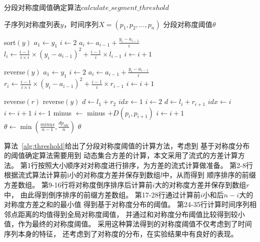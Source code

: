 \begin{algorithm}[t]
  \caption{分段对称度阈值确定算法$calculate\_segment\_threshold$}
  \label{alg:threshold}
  \small
  \begin{algorithmic}
    \REQUIRE 子序列对称度列表$y$，时间序列$X=\left(p_{1}, p_{2}, \dots, p_{n}\right)$
    \ENSURE 分段对称度阈值$\theta$

    \STATE sort$(y)$
    \STATE $a_1 \leftarrow y_1$
    \STATE $i \leftarrow 2$
    \STATE $a_i \leftarrow a_{i-1}+\frac{y_i-a_{i-1}}{i}$
    \STATE $l_i \leftarrow \frac{i-1}{i \times i} \times(y_i-a_{i-1})^{2}+\frac{i-1}{i} \times l_{i-1}$
    \STATE $i \leftarrow i+1$
    \ENDWHILE

    \STATE reverse$(y)$
    \STATE $a_1 \leftarrow y_1$
    \STATE $i \leftarrow 2$
    \STATE $a_i \leftarrow a_{i-1}+\frac{y_i-a_{i-1}}{i}$
    \STATE $r_i \leftarrow \frac{i-1}{i \times i} \times (y_i-a_{i-1})^{2}+\frac{i-1}{i} \times r_{i-1}$
    \STATE $i \leftarrow i+1$
    \ENDWHILE

    \STATE reverse$(r)$
    \STATE reverse$(y)$
    \STATE $d \leftarrow l_1 + r_2$
    \STATE $idx \leftarrow 1$
    \STATE $i \leftarrow 2$
    \STATE $d \leftarrow l_i + r_{i+1}$
    \STATE $idx \leftarrow i$
    \ENDIF
    \STATE $i \leftarrow i+1$
    \ENDWHILE
    \STATE $i \leftarrow 1$
    \STATE minus $\leftarrow$ minus $+D\left(p_{i}, p_{i+1}\right)$
    \STATE $i \leftarrow i+1$
    \ENDWHILE
    \STATE $\theta \leftarrow \min \left(\frac{minus}{n-1}, \frac{dp_{idx}}{n}\right)$
    \RETURN $\theta$
  \end{algorithmic}
\end{algorithm}

算法~\ref{alg:threshold}给出了分段对称度阈值的计算方法，考虑到
基于对称度分布的阈值确定算法需要用到
动态集合方差的计算，本文采用了流式的方差计算方法。
第1行按照大小顺序对对称度进行排序，为方差的流式计算做准备。
第2-8行根据流式算法计算前i小的对称度方差并保存到数组$l$中，从而得到
顺序排序的前缀方差数组。
第9-16行将对称度倒序排序后计算前$i$大的对称度方差并保存到数组$r$中，
由此得到倒序排序的前缀方差数组。
第17-28行通过计算前$i$小和后$n-i$大的对称度方差之和的最小值
得到基于对称度分布的阈值。
第24-35行计算时间序列相邻点距离的均值得到全局对称度阈值，
并通过和对称度分布阈值比较得到较小值，作为最终的对称度阈值。
采用这种算法得到的对称度阈值不仅考虑到了时间序列本身的特征，
还考虑到了对称度的分布，在实验结果中有良好的表现。

